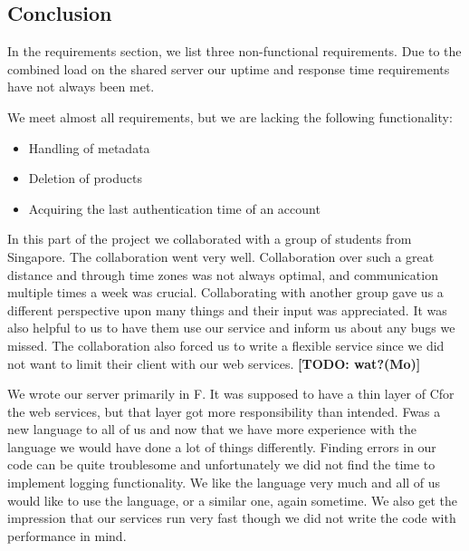 \subsection{Conclusion}
\label{serverconclusion}
In the requirements section, we list three non-functional requirements. Due to the combined load on the shared server our uptime and response time requirements have not always been met.

We meet almost all requirements, but we are lacking the following functionality:
\begin{itemize}
\item Handling of metadata
\item Deletion of products
\item Acquiring the last authentication time of an account
\end{itemize}

In this part of the project we collaborated with a group of students from Singapore. The collaboration went very well. Collaboration over such a great distance and through time zones was not always optimal, and communication multiple times a week was crucial.
Collaborating with another group gave us a different perspective upon many things and their input was appreciated. It was also helpful to us to have them use our service and inform us about any bugs we missed.
The collaboration also forced us to write a flexible service since we did not want to limit their client with our web services. \textbf{[TODO: wat?(Mo)]}

We wrote our server primarily in F\Sh. It was supposed to have a thin layer of C\Sh for the web services, but that layer got more responsibility than intended. 
F\Sh was a new language to all of us and now that we have more experience with the language we would have done a lot of things differently. Finding errors in our code can be quite troublesome and unfortunately we did not find the time to implement logging functionality. We like the language very much and all of us would like to use the language, or a similar one, again sometime. We also get the impression that our services run very fast though we did not write the code with performance in mind.
\newpage